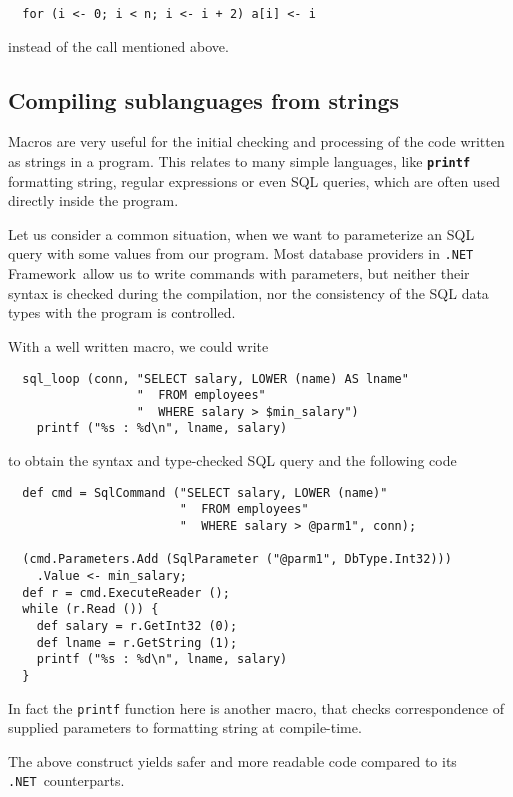 \documentclass{llncs}
\newcommand{\net}[0]{{\tt .NET}}
\newcommand{\netf}[0]{{\tt .NET} Framework}
\newcommand{\kw}[1]{{\tt \bf #1}}
\begin{document}
\begin{verbatim}
  for (i <- 0; i < n; i <- i + 2) a[i] <- i
\end{verbatim}

\noindent
instead of the call mentioned above.

\subsection{Compiling sublanguages from strings}
Macros are very useful for the initial checking and processing of the code
written as strings in a program. This relates to many simple languages,
like \kw{printf} formatting string, regular expressions or even SQL queries, which are 
often used directly inside the program. 

Let us consider a common situation, when we want to parameterize an SQL query
with some values from our program. Most database providers in 
\netf\ allow us to write commands with parameters, but neither their syntax 
is checked during the compilation, nor the consistency of the SQL data types 
with the program is controlled.

With a well written macro, we could write
\begin{verbatim}
  sql_loop (conn, "SELECT salary, LOWER (name) AS lname"
                  "  FROM employees"
                  "  WHERE salary > $min_salary")
    printf ("%s : %d\n", lname, salary)
\end{verbatim} %

\noindent
to obtain the syntax and type-checked SQL query and the following code

\begin{verbatim}
  def cmd = SqlCommand ("SELECT salary, LOWER (name)"
                        "  FROM employees"
                        "  WHERE salary > @parm1", conn);

  (cmd.Parameters.Add (SqlParameter ("@parm1", DbType.Int32)))
    .Value <- min_salary;
  def r = cmd.ExecuteReader ();
  while (r.Read ()) {
    def salary = r.GetInt32 (0);
    def lname = r.GetString (1);
    printf ("%s : %d\n", lname, salary)
  }
\end{verbatim}

In fact the \verb,printf, function here is another macro, that checks
correspondence of supplied parameters to formatting string at compile-time.

The above construct yields safer and more readable code compared to its
\net\ counterparts.
\end{document}
